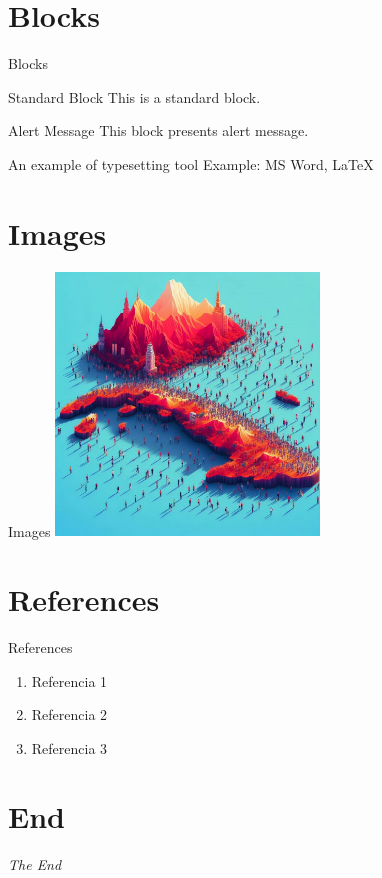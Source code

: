 \documentclass{beamer}
\begin{document}
\section{Blocks}
\begin{frame}{Blocks}
    \begin{block}{Standard Block}
        This is a standard block.
    \end{block}
    \begin{alertblock}{Alert Message}
        This block presents alert message.
    \end{alertblock}
    \begin{exampleblock}{An example of typesetting tool}
        Example: MS Word, \LaTeX{}
    \end{exampleblock}
\end{frame} 

\section{Images}
\begin{frame}{Images}
\includegraphics[height = 7cm]{img/cuba3.jpeg}
\end{frame}

\section{References}
\begin{frame}{References}
\begin{enumerate}
    \item Referencia 1
    \item Referencia 2
    \item Referencia 3
\end{enumerate}

\end{frame}

\section{End}
\begin{frame}
    \textit{The End}
\end{frame}
\end{document}
